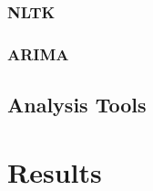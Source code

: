 \documentclass[a4paper,10pt]{article}
\begin{document}
\subsubsection{NLTK}


\subsubsection{ARIMA}


\subsection{Analysis Tools}


\section{Results}




		
		
\end{document}
